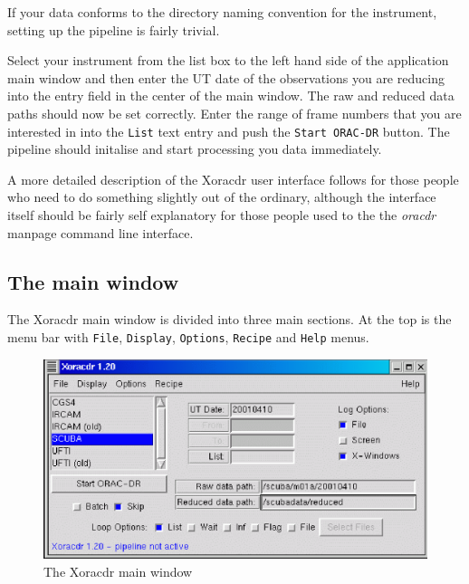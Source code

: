 \documentclass[twoside,11pt]{article}
\renewcommand{\_}{\texttt{\symbol{95}}}
\begin{document}
If your data conforms to the directory naming convention for the
instrument, setting up the pipeline is fairly trivial.



Select your instrument from the list box to the left hand side of the
application main window and then enter the UT date of the observations
you are reducing into the entry field in the center of the main
window. The raw and reduced data paths should now be set
correctly. Enter the range of frame numbers that you are interested in
into the \texttt{List} text entry and push the \texttt{Start ORAC-DR} button. The
pipeline should initalise and start processing you data immediately.



A more detailed description of the Xoracdr user interface follows for
those people who need to do something slightly out of the ordinary,
although the interface itself should be fairly self explanatory for
those people used to the the \emph{oracdr} manpage command line interface.

\subsection*{The main window}

The Xoracdr main window is divided into three main sections. At the
top is the menu bar with \texttt{File}, \texttt{Display}, \texttt{Options}, \texttt{Recipe}
and \texttt{Help} menus.

\begin{figure}
\begin{center}
\includegraphics[width=5.0in]{sun230_xoracdr.eps}
\caption{The Xoracdr main window}
\end{center}
\end{figure}
\end{document}
